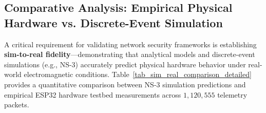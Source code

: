 \subsection{Comparative Analysis: Empirical Physical Hardware vs. Discrete-Event Simulation}
\label{subsec:sim_vs_real_discussion}

A critical requirement for validating network security frameworks is establishing \textbf{sim-to-real fidelity}—demonstrating that analytical models and discrete-event simulations (e.g., NS-3) accurately predict physical hardware behavior under real-world electromagnetic conditions. Table~\ref{tab_sim_real_comparison_detailed} provides a quantitative comparison between NS-3 simulation predictions and empirical ESP32 hardware testbed measurements across $1,120,555$ telemetry packets.

\begin{table}[htbp]
\caption{Detailed Comparison between NS-3 Simulation and Physical ESP32 Testbed}
\label{tab_sim_real_comparison_detailed}
\centering
\small
\renewcommand{\arraystretch}{1.2}
\end{table}

